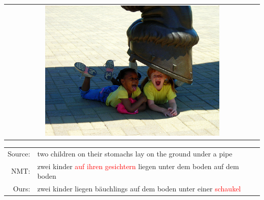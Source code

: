 \begin{table}[h]
\scriptsize
\renewcommand{\arraystretch}{1.2}
\begin{subtable}{0.22\textwidth}
\centering
\begin{tabular}{c}
\includegraphics[width=0.7\textwidth]{chapters/IJCNLP/images/533602654.jpg}
\end{tabular}
\end{subtable}%
\begin{subtable}{0.75\textwidth}
\begin{tabular}{rp{27em}}
Source: & two children on their stomachs lay on the ground under a pipe \\
NMT: & zwei kinder \textcolor{red}{auf ihren gesichtern} liegen unter dem boden auf dem boden \\
Ours: & zwei kinder liegen bäuchlings auf dem boden unter einer \textcolor{red}{schaukel}
 \\
\end{tabular}
\end{subtable}

\vspace{0em}


\end{table}
